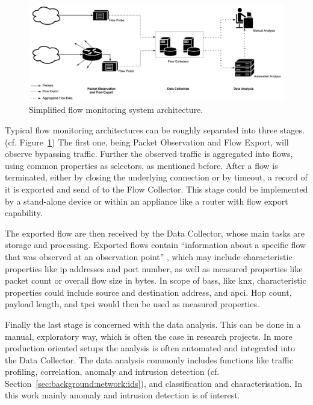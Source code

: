 \begin{figure}
	\centering
	\includegraphics[width=\textwidth]{figures/200-netflow-architecture.pdf}
	\caption[Simplified flow monitoring system architecture]{Simplified flow monitoring system architecture. \parencite[cf.][]{Hofstede2014} }
	\label{fig:background:network:netflow:architecture}
\end{figure}

Typical flow monitoring architectures can be roughly separated into three stages. (cf. Figure~\ref{fig:background:network:netflow:architecture})
The first one, being Packet Observation and Flow Export, will observe bypassing traffic. Further the observed traffic is aggregated into flows, using common properties as selectors, as mentioned before.
After a flow is terminated, either by closing the underlying connection or by timeout, a record of it is exported and send of to the Flow Collector.
This stage could be implemented by a stand-alone device or within an appliance like a router with flow export capability. \parencite{Hofstede2014}

The exported flow are then received by the Data Collector, whose main tasks are storage and processing.
Exported flows contain \enquote{information about a specific flow that was observed at an observation point} \parencite{Claise2013}, which may include characteristic properties like \gls{ip} addresses and port number, as well as measured properties like packet count or overall flow size in bytes. \parencite{Hofstede2014}
In scope of \glspl{bas}, like \gls{knx}, characteristic properties could include source and destination address, and \gls{apci}. Hop count, payload length, and \gls{tpci} would then be used as measured properties.

Finally the last stage is concerned with the data analysis. This can be done in a manual, exploratory way, which is often the case in research projects. In more production oriented setups the analysis is often automated and integrated into the Data Collector.
The data analysis commonly includes functions like traffic profiling, correlation, anomaly and intrusion detection (cf. Section~\ref{sec:background:network:ids}), and classification and characterisation. \parencite[cf.][]{Hofstede2014}
In this work mainly anomaly and intrusion detection is of interest.


